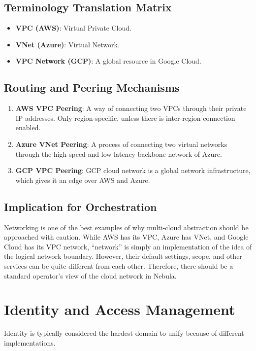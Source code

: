 \subsection{Terminology Translation Matrix}
\begin{itemize}
    \item \textbf{VPC (AWS)}: Virtual Private Cloud.
    \item \textbf{VNet (Azure)}: Virtual Network.
    \item \textbf{VPC Network (GCP)}: A global resource in Google Cloud.
\end{itemize}

\subsection{Routing and Peering Mechanisms}
\begin{enumerate}
    \item \textbf{AWS VPC Peering}: A way of connecting two VPCs through their private IP addresses. Only region-specific, unless there is inter-region connection enabled.
    \item \textbf{Azure VNet Peering}: A process of connecting two virtual networks through the high-speed and low latency backbone network of Azure.
    \item \textbf{GCP VPC Peering}: GCP cloud network is a global network infrastructure, which gives it an edge over AWS and Azure.
\end{enumerate}

\subsection{Implication for Orchestration}
Networking is one of the best examples of why multi-cloud abstraction should be approached with caution. While AWS has its VPC, Azure has VNet, and Google Cloud has its VPC network, “network” is simply an implementation of the idea of the logical network boundary. However, their default settings, scope, and other services can be quite different from each other. Therefore, there should be a standard operator’s view of the cloud network in Nebula.

\section{Identity and Access Management}
Identity is typically considered the hardest domain to unify because of different implementations.


